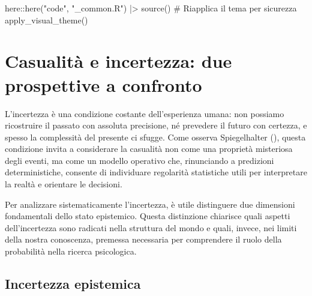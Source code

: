 \documentclass[
  italian,
  letterpaper,
  a4paper,
  11pt,
  open=any]{scrbook}
\newenvironment{Shaded}{\begin{snugshade}}{\end{snugshade}}
\newcommand{\CommentTok}[1]{\textcolor[rgb]{0.37,0.37,0.37}{#1}}
\newcommand{\FunctionTok}[1]{\textcolor[rgb]{0.28,0.35,0.67}{#1}}
\newcommand{\NormalTok}[1]{\textcolor[rgb]{0.00,0.23,0.31}{#1}}
\newcommand{\SpecialCharTok}[1]{\textcolor[rgb]{0.37,0.37,0.37}{#1}}
\newcommand{\StringTok}[1]{\textcolor[rgb]{0.13,0.47,0.30}{#1}}
\theoremstyle{plain}
\theoremstyle{definition}
\theoremstyle{definition}
\theoremstyle{remark}
\begin{document}
\begin{tcolorbox}[enhanced jigsaw, arc=.35mm, bottomrule=.15mm, bottomtitle=1mm, breakable, colback=white, colbacktitle=quarto-callout-caution-color!10!white, colframe=quarto-callout-caution-color-frame, coltitle=black, left=2mm, leftrule=.75mm, opacityback=0, opacitybacktitle=0.6, rightrule=.15mm, title=\textcolor{quarto-callout-caution-color}{\faFire}\hspace{0.5em}{Preparazione del Notebook}, titlerule=0mm, toprule=.15mm, toptitle=1mm]

\begin{Shaded}
\begin{Highlighting}[]
\NormalTok{here}\SpecialCharTok{::}\FunctionTok{here}\NormalTok{(}\StringTok{"code"}\NormalTok{, }\StringTok{"\_common.R"}\NormalTok{) }\SpecialCharTok{|\textgreater{}} 
  \FunctionTok{source}\NormalTok{()}
\CommentTok{\# Riapplica il tema per sicurezza}
\FunctionTok{apply\_visual\_theme}\NormalTok{()}
\end{Highlighting}
\end{Shaded}

\end{tcolorbox}

\section{Casualità e incertezza: due prospettive a
confronto}\label{casualituxe0-e-incertezza-due-prospettive-a-confronto}

L'incertezza è una condizione costante dell'esperienza umana: non
possiamo ricostruire il passato con assoluta precisione, né prevedere il
futuro con certezza, e spesso la complessità del presente ci sfugge.
Come osserva Spiegelhalter
(), questa condizione
invita a considerare la casualità non come una proprietà misteriosa
degli eventi, ma come un modello operativo che, rinunciando a predizioni
deterministiche, consente di individuare regolarità statistiche utili
per interpretare la realtà e orientare le decisioni.

Per analizzare sistematicamente l'incertezza, è utile distinguere due
dimensioni fondamentali dello stato epistemico. Questa distinzione
chiarisce quali aspetti dell'incertezza sono radicati nella struttura
del mondo e quali, invece, nei limiti della nostra conoscenza, premessa
necessaria per comprendere il ruolo della probabilità nella ricerca
psicologica.

\subsection{Incertezza epistemica}\label{incertezza-epistemica}
\end{document}
